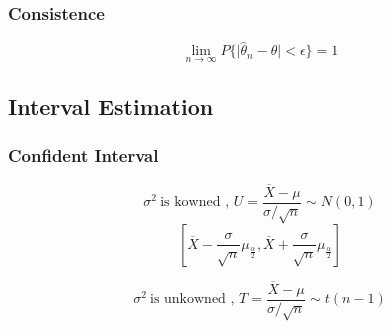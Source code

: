 \documentclass{ctexart}
\begin{document}
\subsubsection{Consistence}
\[\lim_{n\to \infty}P\{\mid \hat{\theta}_n-\theta \mid <\epsilon\}=1\]

\subsection{Interval Estimation}

\subsubsection{Confident Interval}

\[\sigma^2\ \text{is kowned , }U=\frac{\overline{X}-\mu}{\sigma / \sqrt{n}}\sim N(0,1)\]
\[[\overline{X}-\frac{\sigma}{\sqrt{n}}\mu_{\frac{\alpha}{2}},\overline{X}+\frac{\sigma}{\sqrt{n}}\mu_{\frac{\alpha}{2}}]\]

\[\sigma^2\ \text{is unkowned , }T=\frac{\overline{X}-\mu}{\sigma /\sqrt{n}}\sim t(n-1)\]
\end{document}

